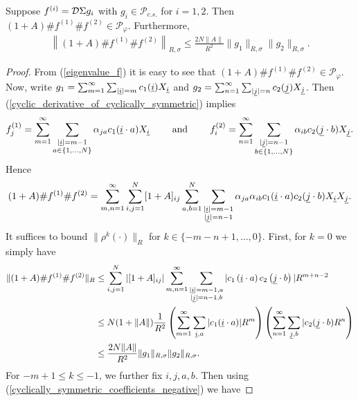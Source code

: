 \begin{lem}\label{dot_product_in_centralizer}
Suppose $f^{(i)}=\mathcal D\Sigma g_i$ with $g_i\in \mathscr{P}_{c.s.}$ for $i=1,2$. Then $(1+A)\# f^{(1)}\# f^{(2)}\in\mathscr{P}_\varphi$. Furthermore,
	\begin{align*}
		\left\|(1+A)\# f^{(1)}\# f^{(2)} \right\|_{R,\sigma} \leq \frac{2N\|A\|}{R^2} \|g_1\|_{R,\sigma}\|g_2\|_{R,\sigma}.
	\end{align*}
\end{lem}
\begin{proof}
From (\ref{eigenvalue_f}) it is easy to see that $(1+A)\# f^{(1)}\# f^{(2)}\in\mathscr{P}_\varphi$. Now, write $g_1=\sum_{m=1}^\infty \sum_{|\underline{i}|=m} c_1(\underline{i}) X_{\underline{i}}$ and $g_2 = \sum_{n=1}^\infty \sum_{|\underline{j}|=n}c_2(\underline{j})X_{\underline{j}}$. Then (\ref{cyclic_derivative_of_cyclically_symmetric}) implies
	\begin{align*}
		f_j^{(1)}=\sum_{m=1}^\infty \sum_{\substack{|\underline{i}|=m-1\\ a\in\{1,\ldots, N\}}}\alpha_{ja} c_1(\underline{i}\cdot a) X_{\underline{i}}\qquad\text{ and }\qquad f_i^{(2)} = \sum_{n=1}^\infty \sum_{\substack{|\underline{j}|=n-1\\ b\in\{1,\ldots, N\}}} \alpha_{ib} c_2(\underline{j}\cdot b) X_{\underline{j}}.
	\end{align*}
Hence
	\begin{align*}
		(1+A)\# f^{(1)}\# f^{(2)} =\sum_{m,n=1}^\infty \sum_{i,j=1}^N [1+A]_{ij}  \sum_{a,b=1}^N \sum_{\substack{|\underline{i}|=m-1\\ |\underline{j}|=n-1}} \alpha_{ja}\alpha_{ib} c_1(\underline{i}\cdot a)c_2(\underline{j}\cdot b) X_{\underline{i}} X_{\underline{j}}.
	\end{align*}
It suffices to bound $\|\rho^k(\cdot )\|_R$ for $k\in\{-m-n+1,\ldots, 0\}$. First, for $k=0$ we simply have
	\begin{align*}
		\| (1+A)\#f^{(1)}\# f^{(2)}\|_R &\leq \sum_{i,j=1}^N | [1+A]_{ij}| \sum_{m,n=1}^\infty \sum_{\substack{|\underline{i}|=m-1,a\\ |\underline{j}|=n-1, b}} |c_1\left(\underline{i}\cdot a\right) c_2\left(\underline{j}\cdot b\right)| R^{m+n-2}\\
							&\leq N(1+\|A\|)\frac{1}{R^2} \left(\sum_{m=1}^\infty\sum_{\underline{i},a} |c_1(\underline{i}\cdot a)| R^m\right)\left(\sum_{n=1}^\infty \sum_{\underline{j},b} |c_2(\underline{j}\cdot b) R^n\right)\\
							&\leq \frac{2N\|A\|}{R^2}\|g_1\|_{R,\sigma}\|g_2\|_{R,\sigma}.
	\end{align*}
For $-m+1\leq k\leq -1$, we further fix $i,j,a,b$. Then using (\ref{cyclically_symmetric_coefficients_negative}) we have

\end{proof}
